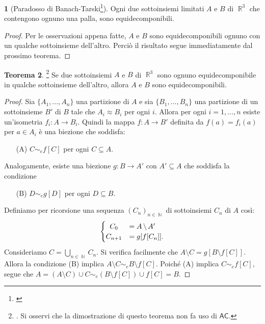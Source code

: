 \documentclass[12pt,a4paper]{report}
\theoremstyle{definition}
\newtheorem{teo}{Teorema}[section]  %
\theoremstyle{num.custom-title}
\newtheorem{teo_custom-title}[teo]{} %
\DeclareMathOperator{\N}{\mathbb{N}}
\DeclareMathOperator{\R}{\mathbb{R}}
\DeclareMathOperator{\sm}{\setminus}
\newcommand{\AC}{\ensuremath{\mathsf{AC}}\xspace}
\begin{document}
\begin{teo_custom-title}[Paradosso di Banach-Tarski\footnote{\cite{BaTa24:Herrlich}}] Ogni due sottoinsiemi limitati $A$ e $B$ di $\R^3$ che contengono ognuno una palla, sono equidecomponibili.
\begin{proof}\renewcommand{\qedsymbol}{}
Per le osservazioni appena fatte, $A$ e $B$ sono equidecomponibili ognuno con un qualche sottoinsieme dell'altro. Perciò il risultato segue immediatamente dal prossimo teorema.
\end{proof}
\end{teo_custom-title}

\begin{teo}\footnote{\cite{Bana23:Herrlich}. Si osservi che la dimostrazione di questo teorema non fa uso di \AC.} Se due sottoinsiemi $A$ e $B$ di $\R^3$ sono ognuno equidecomponibile in qualche sottoinsieme dell'altro, allora $A$ e $B$ sono equidecomponibili.
\begin{proof}
Sia $\{A_1,...,A_n\}$ una partizione di $A$ e sia $\{B_1,...,B_n\}$ una partizione di un sottoinsieme $B'$ di $B$ tale che $A_i \approx B_i$ per ogni $i$. Allora per ogni $i=1,...,n$ esiste un'isometria $f_i: A \to B_i$. Quindi la mappa $f: A \to B'$ definita da $f(a)=f_i(a)$ per $a \in A_i$ è una biezione che soddisfa:
\begin{itemize}
\item[(A)] $C \sim_e f[C]$ per ogni $C \subseteq A$.
\end{itemize}
Analogamente, esiste una biezione $g: B \to A'$ con $A' \subseteq A$ che soddisfa la condizione
\begin{itemize}
\item[(B)] $D \sim_e g[D]$ per ogni $D \subseteq B$.
\end{itemize}
Definiamo per ricorsione una sequenza $(C_n)_{n \in \N}$ di sottoinsiemi $C_n$ di $A$ così:
\[
  \begin{cases} 
      \hfill C_0 		\hfill & = A \sm A' \\
      \hfill  C_{n+1}	\hfill & = g[f[C_n]]. \\
  \end{cases}
\]
Consideriamo $C=\bigcup_{n \in \N} C_n$. Si verifica facilmente che $A\! \sm\! C = g[B\! \sm\! f[C]]$. Allora la condizione (B) implica $A\! \sm\! C \sim_e B\! \sm\! f[C]$. Poiché (A) implica $C \sim_e f[C]$, segue che $A=(A \sm C) \cup C \sim_e (B \sm f[C]) \cup f[C]=B$.
\end{proof}
\end{teo}
\end{document}
